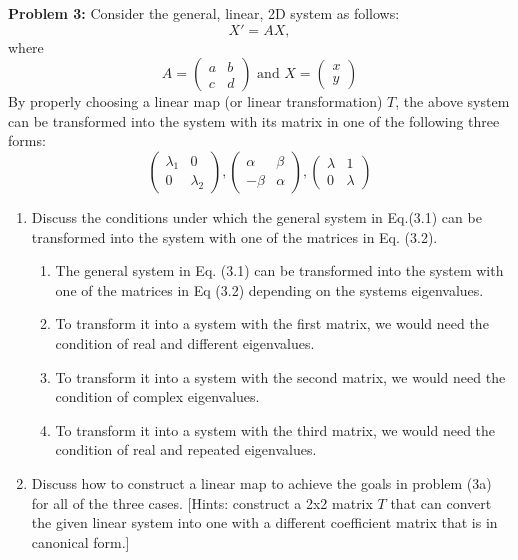 \documentclass[11pt]{article}
\newenvironment{problem}[1]{\textbf{Problem #1: }}{\newpage}
\begin{document}
	\begin{problem}{3}
		Consider the general, linear, 2D system as follows:
		\[X' = AX, \tag{3.1}\]
		where 
		\[A = 
		\begin{pmatrix}
			a & b \\ c & d
		\end{pmatrix} \text{ and } 
		X = 
		\begin{pmatrix}
			x \\ y
		\end{pmatrix}\]
		By properly choosing a linear map (or linear transformation) $T$, the above system can be transformed into the system with its matrix in one of the following three forms:
		\[
		\begin{pmatrix}
			\lambda_1 & 0 \\
			0 & \lambda_2
		\end{pmatrix}, 
		\begin{pmatrix}
			\alpha & \beta \\
			-\beta & \alpha
		\end{pmatrix}, 
		\begin{pmatrix}
			\lambda & 1 \\
			0 & \lambda
		\end{pmatrix} \tag{3.2}
		\]
		\begin{enumerate}[label = (\alph*)]
			\item Discuss the conditions under which the general system in Eq.(3.1) can be transformed into the system with one of the matrices in Eq. (3.2).
			\begin{enumerate}[label = (\roman*)]
				\item The general system in Eq. (3.1) can be transformed into the system with one of the matrices in Eq (3.2) depending on the systems eigenvalues.  
				\item To transform it into a system with the first matrix, we would need the condition of real and different eigenvalues. 
				\item To transform it into a system with the second matrix, we would need the condition of complex eigenvalues. 
				\item To transform it into a system with the third matrix, we would need the condition of real and repeated eigenvalues. 
			\end{enumerate}
			\item  Discuss how to construct a linear map to achieve the goals in problem (3a) for all of the three cases. [Hints: construct a 2x2 matrix $T$ that can convert the given linear system into one with a different coefficient matrix that is in canonical form.]

\end{enumerate}
\end{problem}
\end{document}

